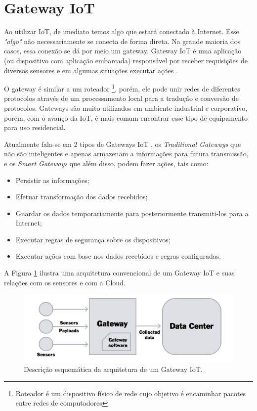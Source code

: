 \section{Gateway IoT}
\label{sec:iotGateway}

Ao utilizar IoT, de imediato temos algo que estará conectado à Internet. Esse \textit{"algo"} não necessariamente se conecta de forma direta. Na grande maioria dos casos, essa conexão se dá por meio um gateway. Gateway IoT é uma aplicação (ou dispositivo com aplicação embarcada) responsável por receber requisições de diversos sensores e em algumas situações executar ações \cite{ChenJiaLi}. 

O gateway é similar a um roteador \footnote{Roteador é um dispositivo físico de rede cujo objetivo é encaminhar pacotes entre redes de computadores}, porém, ele pode unir redes de diferentes protocolos através de um processamento local para a tradução e conversão de protocolos. Gateways são muito utilizados em ambiente industrial e corporativo, porém, com o avanço da IoT, é mais comum encontrar esse tipo de equipamento para uso residencial.

Atualmente fala-se em 2 tipos de Gateways IoT \cite{WhatIsIotGateway}, os \textit{Traditional Gateways} que não são inteligentes e apenas armazenam a informações para futura transmissão, e os \textit{Smart Gateways} que além disso, podem fazer ações, tais como:
\begin{itemize}
	\item Persistir as informações;
	\item Efetuar transformação dos dados recebidos;
	\item Guardar os dados temporariamente para posteriormente transmiti-los para a Internet;
	\item Executar regras de segurança sobre os dispositivos;
	\item Executar ações com base nos dados recebidos e regras configuradas.
\end{itemize}

A Figura \ref{fig:arquiteturaIotGateway} ilustra uma arquitetura convencional de um Gateway IoT e suas relações com os sensores e com a Cloud.
\begin{figure}[h!]
	\begin{center}
		\includegraphics[width=1\textwidth]{./img/rumFxS7.png}
		\caption{Descrição esquemática da arquitetura de um Gateway IoT. \cite{DZone}}
		\label{fig:arquiteturaIotGateway}
	\end{center}
\end{figure}

